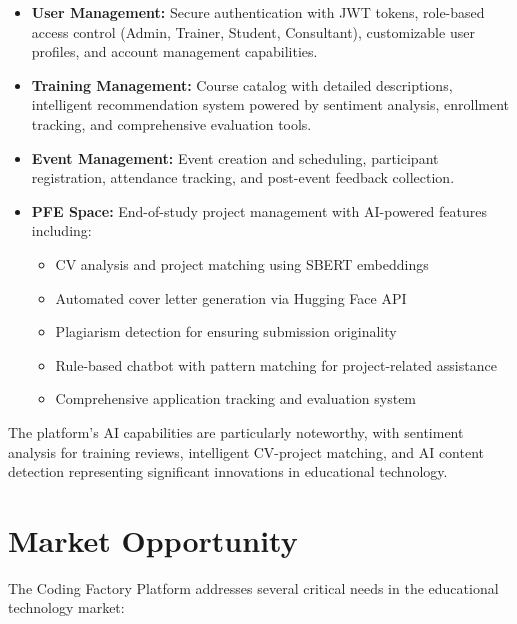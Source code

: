 \documentclass[12pt,a4paper]{report}
\begin{document}
\begin{itemize}
    \item \textbf{User Management:} Secure authentication with JWT tokens, role-based access control (Admin, Trainer, Student, Consultant), customizable user profiles, and account management capabilities.

    \item \textbf{Training Management:} Course catalog with detailed descriptions, intelligent recommendation system powered by sentiment analysis, enrollment tracking, and comprehensive evaluation tools.

    \item \textbf{Event Management:} Event creation and scheduling, participant registration, attendance tracking, and post-event feedback collection.

    \item \textbf{PFE Space:} End-of-study project management with
          AI-powered features including:
    \begin{itemize}
        \item CV analysis and project matching using SBERT embeddings
        \item Automated cover letter generation via Hugging Face API
        \item Plagiarism detection for ensuring submission originality
        \item Rule-based chatbot with pattern matching for project-related assistance
        \item Comprehensive application tracking and evaluation system
    \end{itemize}
\end{itemize}

The platform's AI capabilities are particularly noteworthy, with sentiment analysis for training reviews, intelligent CV-project matching, and AI content detection representing significant innovations in educational technology.

\section{Market Opportunity}
The Coding Factory Platform addresses several critical needs in the educational technology market:
\end{document}
